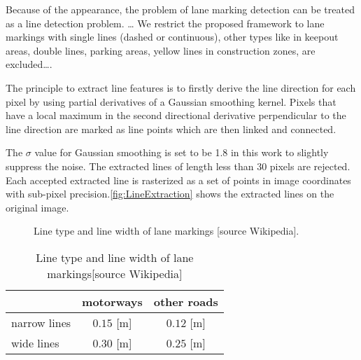 Because of the appearance, the problem of lane marking detection can be treated as a line detection problem. …
We restrict the proposed framework to lane markings with single lines (dashed or continuous), other types like in keepout areas, double lines, parking areas, yellow lines in construction zones, are excluded….

The principle to extract line features is to firstly derive the line direction for each pixel by using partial derivatives of a Gaussian smoothing kernel. Pixels that have a local maximum in the second directional derivative perpendicular to the line direction are marked as line points which are then linked and connected.

The $\sigma$ value for Gaussian smoothing is set to be 1.8 in this work to slightly suppress the noise. The extracted lines of length less than 30 pixels are rejected. Each accepted extracted line is rasterized as a set of points in image coordinates with sub-pixel precision.\cref{fig:LineExtraction} shows the extracted lines on the original image.

\begin{figure}
\centering
{}
\quad
{}
\newline
{}
\quad
{}
\quad
{}
\caption{\small Line type and line width of lane markings [source Wikipedia].}
\label{fig:Germanlane-markings}
\end{figure}
\setlength{\floatsep}{20pt plus 1.0pt minus 2.0pt}
\begin{table}
    \centering
    \begin{tabular}{l|cc}
    \toprule
           & motorways  & other roads\\
    \midrule
    narrow lines & $0.15$ [m] & $0.12$ [m] \\
    wide lines   & $0.30$ [m] & $0.25$ [m] \\
    \bottomrule
    \end{tabular}
    \caption{\small Line type and line width of lane markings[source Wikipedia]}
    \label{tab:EOaccuracy}
\end{table}


